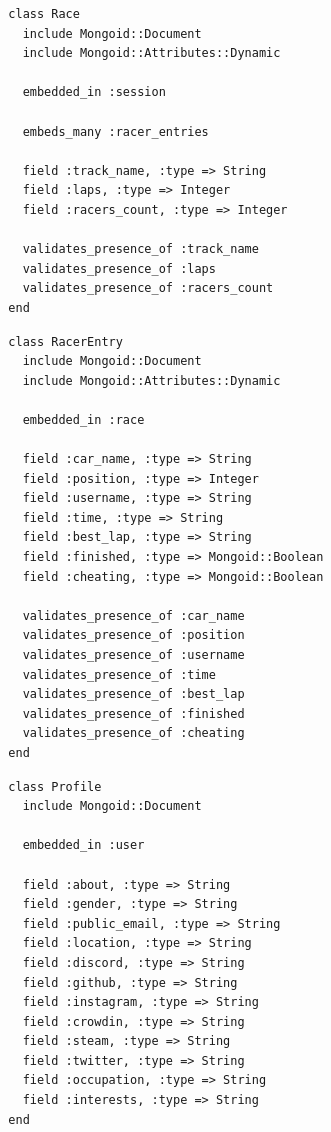\begin{listing}
  \begin{verbatim}
  class Race
    include Mongoid::Document
    include Mongoid::Attributes::Dynamic
    
    embedded_in :session
    
    embeds_many :racer_entries
    
    field :track_name, :type => String
    field :laps, :type => Integer
    field :racers_count, :type => Integer
    
    validates_presence_of :track_name
    validates_presence_of :laps
    validates_presence_of :racers_count
  end
  \end{verbatim}
\end{listing}

\begin{listing}
  \begin{verbatim}
  class RacerEntry
    include Mongoid::Document
    include Mongoid::Attributes::Dynamic
    
    embedded_in :race
    
    field :car_name, :type => String
    field :position, :type => Integer
    field :username, :type => String
    field :time, :type => String
    field :best_lap, :type => String
    field :finished, :type => Mongoid::Boolean
    field :cheating, :type => Mongoid::Boolean
    
    validates_presence_of :car_name
    validates_presence_of :position
    validates_presence_of :username
    validates_presence_of :time
    validates_presence_of :best_lap
    validates_presence_of :finished
    validates_presence_of :cheating
  end
  \end{verbatim}
\end{listing}

\begin{listing}
  \begin{verbatim}
  class Profile
    include Mongoid::Document
    
    embedded_in :user
    
    field :about, :type => String
    field :gender, :type => String
    field :public_email, :type => String
    field :location, :type => String
    field :discord, :type => String
    field :github, :type => String
    field :instagram, :type => String
    field :crowdin, :type => String
    field :steam, :type => String
    field :twitter, :type => String
    field :occupation, :type => String
    field :interests, :type => String
  end
  \end{verbatim}
\end{listing}

